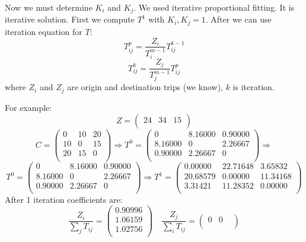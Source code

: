 Now we must determine $K_i$ and $K_j$. We used iterative proportional fitting. It is iterative solution. First we compute $T^1$ with $K_i, K_j = 1$. After we can use iteration equation for $T$:
$$T_{ij}^{p} = \frac{Z_i}{T_i^{m-1}} T_{ij}^{k-1}$$
$$T_{ij}^{k} = \frac{Z_j}{T_j^{m-1}} T_{ij}^{p}$$
where $Z_i$ and $Z_j$ are origin and destination trips (we know), $k$ is iteration.

For example:
$$Z = (\begin{array}{ccc}
24  & 34  & 15\\
\end{array})$$
$$
C = \left(\begin{array}{ccc}
0& 10 &20 \\
10& 0 &15 \\
20 & 15& 0 \\
\end{array}\right) \Rightarrow T^0 = \left(\begin{array}{ccc}
       0  & 8.16000  &  0.90000\\
   8.16000  &     0  & 2.26667\\
   0.90000  & 2.26667  &    0\\
\end{array}\right) \Rightarrow$$
$$T^0 = \left(\begin{array}{ccc}
       0  & 8.16000  &  0.90000\\
   8.16000  &     0  & 2.26667\\
   0.90000  & 2.26667  &    0\\
\end{array}\right) \Rightarrow T^1 = \left( \begin{array}{ccc}
    0.00000 &  22.71648 &   3.65832 \\
   20.68579 &   0.00000 &  11.34168 \\
    3.31421 &  11.28352 &   0.00000 \\
\end{array} \right)$$
After 1 iteration coefficients are:
$$\frac{Z_i}{\sum_j T_{ij}} = \left(\begin{array}{c}
0.90996 \\
1.06159  \\
1.02756\\
\end{array}\right) \quad \frac{Z_j}{\sum_i T_{ij}} = \left(\begin{array}{ccc}
0  & 0 &\\
\end{array}\right)$$


